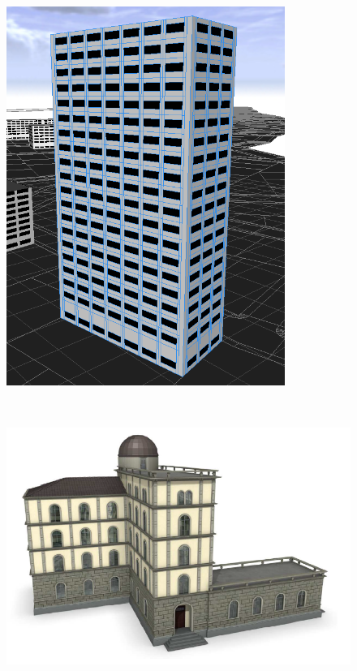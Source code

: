 \begin{figure}
\centering
\begin{minipage}{.48\textwidth}
  \centering
  \includegraphics[width=.5\linewidth]{img/Theory/Shape_Grammars/Edificio.png}
  \label{fig:SGBuilding}
\end{minipage}
~~
\begin{minipage}{.48\textwidth}
  \centering
  \includegraphics[width=0.8\linewidth]{img/Theory/Shape_Grammars/Capturar.png}
  \label{fig:CEBuilding}
\end{minipage}
\end{figure}

